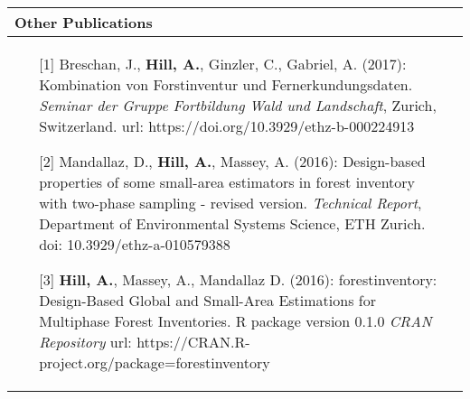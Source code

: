 \noindent
\begin{tabular*}{\textwidth}{p{}p{}}
	\multicolumn{2}{l}{\large Other Publications}\\
	\toprule
	
	\begin{enumerate}[]
		
		\item [{[1]}] Breschan, J., \textbf{Hill, A.}, Ginzler, C., Gabriel, A. (2017): Kombination von Forstinventur und Fernerkundungsdaten. \textit{Seminar der Gruppe Fortbildung Wald und Landschaft}, Zurich, Switzerland. url: https://doi.org/10.3929/ethz-b-000224913
		
		\item [{[2]}] Mandallaz, D., \textbf{Hill, A.}, Massey, A. (2016): Design-based properties of some small-area estimators in forest inventory with two-phase sampling - revised version. \textit{Technical Report}, Department of Environmental Systems Science, ETH Zurich. doi: 10.3929/ethz-a-010579388
		
		\item [{[3]}] \textbf{Hill, A.}, Massey, A., Mandallaz D. (2016): forestinventory: Design-Based Global and Small-Area Estimations for Multiphase Forest Inventories. R package version 0.1.0 \textit{CRAN Repository} url: https://CRAN.R-project.org/package=forestinventory

	\end{enumerate}	
	&\\
\end{tabular*}























